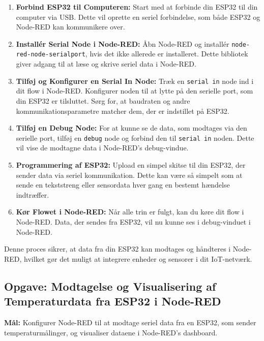 \begin{enumerate}
	\item \textbf{Forbind ESP32 til Computeren:} Start med at forbinde din ESP32 til din computer via USB. Dette vil oprette en seriel forbindelse, som både ESP32 og Node-RED kan kommunikere over.
	
	\item \textbf{Installér Serial Node i Node-RED:} Åbn Node-RED og installér \texttt{node-red-node-serialport}, hvis det ikke allerede er installeret. Dette bibliotek giver adgang til at læse og skrive seriel data i Node-RED.
	
	\item \textbf{Tilføj og Konfigurer en Serial In Node:} Træk en \texttt{serial in} node ind i dit flow i Node-RED. Konfigurer noden til at lytte på den serielle port, som din ESP32 er tilsluttet. Sørg for, at baudraten og andre kommunikationsparametre matcher dem, der er indstillet på ESP32.
	
	\item \textbf{Tilføj en Debug Node:} For at kunne se de data, som modtages via den serielle port, tilføj en \texttt{debug} node og forbind den til \texttt{serial in} noden. Dette vil vise de modtagne data i Node-RED's debug-vindue.
	
	\item \textbf{Programmering af ESP32:} Upload en simpel skitse til din ESP32, der sender data via seriel kommunikation. Dette kan være så simpelt som at sende en tekststreng eller sensordata hver gang en bestemt hændelse indtræffer.
	
	\item \textbf{Kør Flowet i Node-RED:} Når alle trin er fulgt, kan du køre dit flow i Node-RED. Data, der sendes fra ESP32, vil nu kunne ses i debug-vinduet i Node-RED.
	
\end{enumerate}
Denne proces sikrer, at data fra din ESP32 kan modtages og håndteres i Node-RED, hvilket gør det muligt at integrere enheder og sensorer i dit IoT-netværk.

\subsection{Opgave: Modtagelse og Visualisering af Temperaturdata fra ESP32 i Node-RED}
\noindent \textbf{Mål:} Konfigurer Node-RED til at modtage seriel data fra en ESP32, som sender temperaturmålinger, og visualiser dataene i Node-RED's dashboard.

